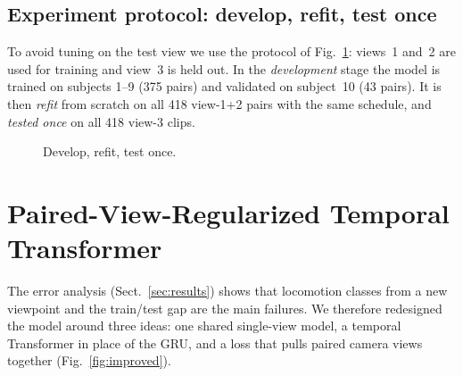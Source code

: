 \documentclass[runningheads]{llncs}
\begin{document}
\subsection{Experiment protocol: develop, refit, test once}
To avoid tuning on the test view we use the protocol of Fig.~\ref{fig:protocol}: views~1 and~2 are used for training and view~3 is held out. In the \emph{development} stage the model is trained on subjects 1--9 (375 pairs) and validated on subject~10 (43 pairs). It is then \emph{refit} from scratch on all 418 view-1+2 pairs with the same schedule, and \emph{tested once} on all 418 view-3 clips.

\begin{figure}[t]
\centering
{}
\caption{Develop, refit, test once.}\label{fig:protocol}
\end{figure}

\section{Paired-View-Regularized Temporal Transformer}\label{sec:transformer}
The error analysis (Sect.~\ref{sec:results}) shows that locomotion classes from a new viewpoint and the train/test gap are the main failures. We therefore redesigned the model around three ideas: one shared single-view model, a temporal Transformer in place of the GRU, and a loss that pulls paired camera views together (Fig.~\ref{fig:improved}).
\end{document}
